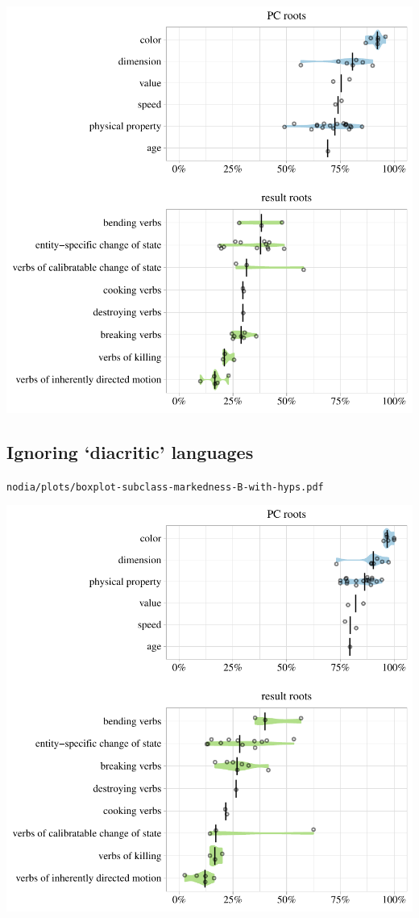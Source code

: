 \includegraphics[width=1.0\textwidth]{../nolow/plots/boxplot-subclass-markedness-B-with-hyps.pdf}

\subsection{Ignoring `diacritic' languages}

\texttt{nodia/plots/boxplot-subclass-markedness-B-with-hyps.pdf}

\includegraphics[width=1.0\textwidth]{../nodia/plots/boxplot-subclass-markedness-B-with-hyps.pdf}

